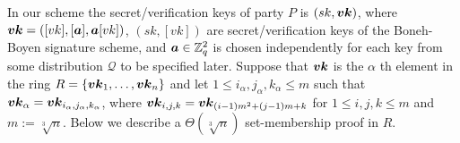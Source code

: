 %
%
%

In our scheme the secret/verification keys of party $P$ is $(sk,{\boldsymbol{vk}})$, where ${\boldsymbol{vk}}=([vk],[{\boldsymbol{a}}],{\boldsymbol{a}}[vk])$, $(sk,[vk])$ are secret/verification keys of the Boneh-Boyen signature scheme, and ${\boldsymbol{a}}\in\mathbb{Z}_q^2$ is chosen independently for each key from some distribution $\mathcal{Q}$ to be specified later. Suppose that ${\boldsymbol{vk}}$ is the $\alpha$ th element in the ring $R=\{{\boldsymbol{vk}}_{1},\ldots,{\boldsymbol{vk}}_{n}\}$ and let $1\leq i_\alpha,j_\alpha,k_\alpha \leq m$ such that ${\boldsymbol{vk}}_\alpha = {\boldsymbol{vk}}_{i_\alpha,j_\alpha,k_\alpha}$, where ${\boldsymbol{vk}}_{i,j,k}={\boldsymbol{vk}}_{(i-1)m^2+(j-1)m+k}$ for $1\leq  i,j,k\leq m$ and $m:=\sqrt[3]{n}$. Below we describe a $\Theta(\sqrt[3]{n})$ set-membership proof in $R$.

